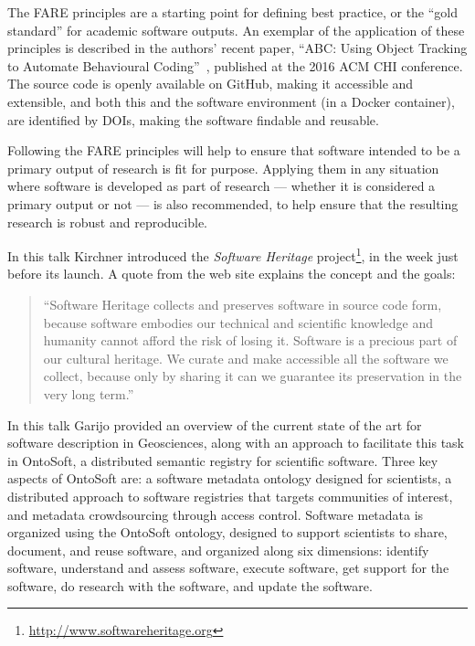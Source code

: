 \documentclass[a4paper,UKenglish]{dagrep}
\begin{document}
The FARE principles are a starting point for defining best practice, or the ``gold standard'' for academic software outputs. An exemplar of the application of these principles is described in the authors' recent paper, ``ABC: Using Object Tracking to Automate Behavioural Coding''~\cite{apaolaza_2016}, published at the 2016 ACM CHI conference. The source code is openly available on GitHub, making it accessible and extensible, and both this and the software environment (in a Docker container), are identified by DOIs, making the software findable and reusable.

Following the FARE principles will help to ensure that software intended to be a primary output of research is fit for purpose. Applying them in any situation where software is developed as part of research --- whether it is considered a primary output or not --- is also recommended, to help ensure that the resulting research is robust and reproducible.


In this talk Kirchner introduced the \emph{Software Heritage} project\footnote{\url{http://www.softwareheritage.org}}, in the week just before its launch.  
A quote from the web site explains the concept and the goals:
\begin{quote}
``Software Heritage collects and preserves software in source code form, because software embodies our technical and scientific knowledge and humanity cannot afford the risk of losing it.
Software is a precious part of our cultural heritage. We curate and make accessible all the software we collect, because only by sharing it can we guarantee its preservation in the very long term.''
\end{quote}


In this talk Garijo provided an overview of the current state of the art for software description in Geosciences, along with an approach to facilitate this task in OntoSoft, a distributed semantic registry for scientific software. Three key aspects of OntoSoft are: a software metadata ontology designed for scientists, a distributed approach to software registries that targets communities of interest, and metadata crowdsourcing through access control. Software metadata is organized using the OntoSoft ontology, designed to support scientists to share, document, and reuse software, and organized along six dimensions: identify software, understand and assess software, execute software, get support for the software, do research with the software, and update the software.
\end{document}
